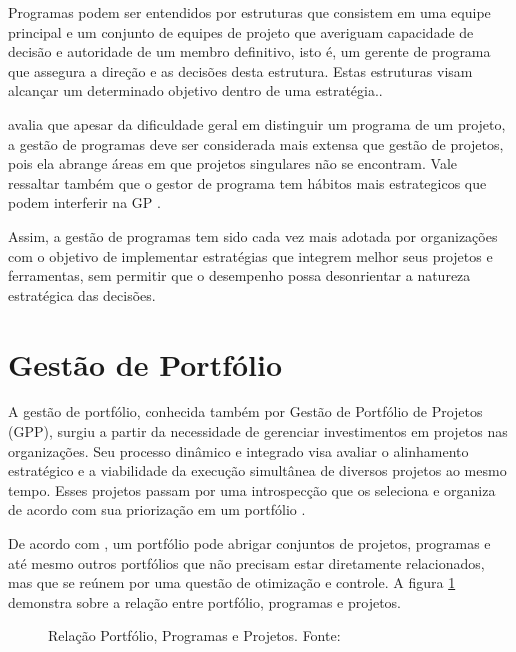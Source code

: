 Programas podem ser entendidos por estruturas que consistem em uma equipe principal e um conjunto de equipes de projeto que averiguam capacidade de decisão e autoridade de um membro definitivo, isto é, um gerente de programa que assegura a direção e as decisões desta estrutura. Estas estruturas visam alcançar um determinado objetivo dentro de uma estratégia.\cite{brown2008handbook}.

 avalia que apesar da dificuldade geral em distinguir um programa de um projeto, a gestão de programas deve ser considerada mais extensa que gestão de projetos, pois ela abrange áreas em que projetos singulares não se encontram. Vale ressaltar também que o gestor de programa tem hábitos mais estrategicos que podem interferir na GP \cite{lycett2004289}.

Assim, a gestão de programas tem sido cada vez mais adotada por organizações com o objetivo de implementar estratégias que integrem melhor seus projetos e ferramentas, sem permitir que o desempenho possa desonrientar a natureza estratégica das decisões.


\section{Gestão de Portfólio}

A gestão de portfólio, conhecida também por Gestão de Portfólio de Projetos (GPP), surgiu a partir da necessidade de gerenciar investimentos em projetos nas organizações. Seu processo dinâmico e integrado visa avaliar o alinhamento estratégico e a viabilidade da execução simultânea de diversos projetos ao mesmo tempo. Esses projetos passam por uma introspecção que os seleciona e organiza de acordo com sua priorização em um portfólio \cite{meredith2011project, kerzner2013project}.

De acordo com , um portfólio pode abrigar conjuntos de projetos, programas e até mesmo outros portfólios que não precisam estar diretamente relacionados, mas que se reúnem por uma questão de otimização e controle. A figura \ref{port_prog_proj} demonstra sobre a relação entre portfólio, programas e projetos.

\begin{figure}[ht]
  \centering
  \caption{Relação Portfólio, Programas e Projetos. Fonte: \cite{pmi2006}}
  \label{port_prog_proj}
\end{figure}

